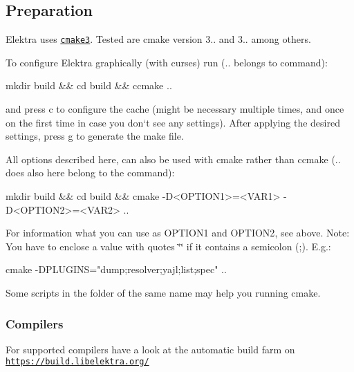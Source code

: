 \subsection*{Preparation}

Elektra uses \href{https://cmake.org/cmake/help/v3.0/}{\tt cmake3}. Tested are cmake version 3.. and 3.. among others.

To configure Elektra graphically (with curses) run ({\ttfamily ..} belongs to command)\+:


\begin{DoxyCode}
mkdir build && cd build && ccmake ..
\end{DoxyCode}


and press {\ttfamily c} to configure the cache (might be necessary multiple times, and once on the first time in case you don‘t see any settings). After applying the desired settings, press {\ttfamily g} to generate the make file.

All options described here, can also be used with {\ttfamily cmake} rather than {\ttfamily ccmake} ({\ttfamily ..} does also here belong to the command)\+:


\begin{DoxyCode}
mkdir build && cd build && cmake -D<OPTION1>=<VAR1> -D<OPTION2>=<VAR2> ..
\end{DoxyCode}


For information what you can use as {\ttfamily O\+P\+T\+I\+O\+N1} and {\ttfamily O\+P\+T\+I\+O\+N2}, see above. Note\+: You have to enclose a value with quotes {\ttfamily \char`\"{}\char`\"{}} if it contains a semicolon ({\ttfamily ;}). E.\+g.\+:


\begin{DoxyCode}
cmake -DPLUGINS="dump;resolver;yajl;list;spec" ..
\end{DoxyCode}


Some scripts in the folder of the same name may help you running cmake.

\subsubsection*{Compilers}

For supported compilers have a look at the automatic build farm on \href{https://build.libelektra.org/}{\tt https\+://build.\+libelektra.\+org/}

